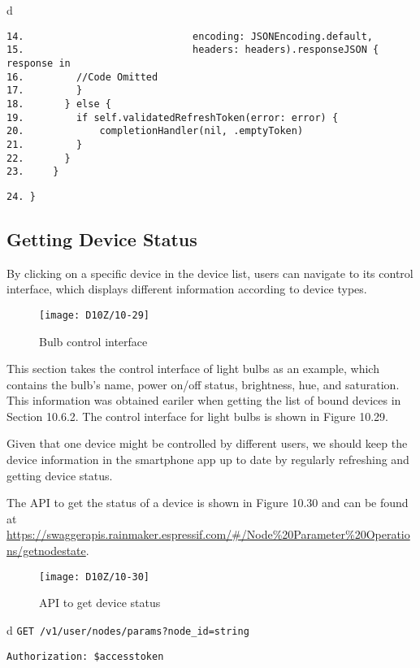 \documentclass[a4paper,12pt]{book}
\begin{document}
\begin{codebloc}
\begin{tabular}{d}
\vspace{2pt}
\begin{verbatim}
14.                             encoding: JSONEncoding.default, 
15.                             headers: headers).responseJSON { response in
16.         //Code Omitted
17.         }
18.       } else {
19.         if self.validatedRefreshToken(error: error) {
20.             completionHandler(nil, .emptyToken)
21.         }
22.       }
23.     }
\end{verbatim}
\verb|24. }|
\end{tabular}
\end{codebloc}

\subsection{Getting Device Status}
By clicking on a specific device in the device list, users can navigate to its control interface, which displays different information according to device types.

\begin{figure}[ht]
    \centering
    \texttt{[image: D10Z/10-29]}
    \caption{Bulb control interface}
\end{figure}

This section takes the control interface of light bulbs as an example, which contains the bulb's name, power on/off status, brightness, hue, and saturation. This information was obtained eariler when getting the list of bound devices in Section 10.6.2. The control interface for light bulbs is shown in Figure 10.29.

Given that one device might be controlled by different users, we should keep the device information in the smartphone app up to date by regularly refreshing and getting device status.

The API to get the status of a device is shown in Figure 10.30 and can be found at \url{https://swaggerapis.rainmaker.espressif.com/\#/Node\%20Parameter\%20Operations/getnodestate}.

\begin{figure}[ht]
    \centering
    \texttt{[image: D10Z/10-30]}
    \caption{API to get device status}
\end{figure}

\begin{codebloc}
\begin{tabular}{d}
\verb|GET /v1/user/nodes/params?node_id=string|

\verb|Authorization: $accesstoken|
\end{tabular}
\end{codebloc}
\end{document}
